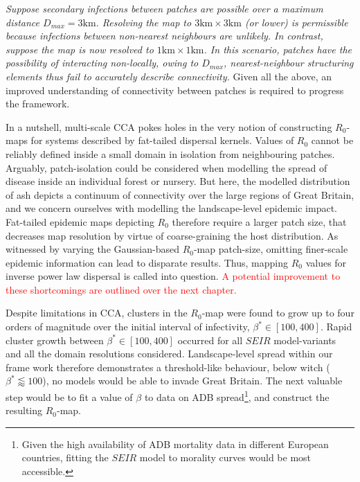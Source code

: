 \textit{Suppose secondary infections between patches are possible over a maximum distance $D_{max} = 3\mathrm{km}$.
Resolving the map to $\mathrm{3km \times 3km}$ (or lower) is permissible because infections between non-nearest neighbours are unlikely.
In contrast, suppose the map is now resolved to $\mathrm{1km \times 1km}$.
In this scenario, patches have the possibility of interacting non-locally, owing to $D_{max}$, nearest-neighbour structuring elements thus fail to accurately describe connectivity.}
Given all the above, an improved understanding of connectivity between patches is required to progress the framework.

In a nutshell, multi-scale CCA pokes holes in the very notion of constructing $R_0$-maps for systems described by fat-tailed dispersal kernels.
Values of $R_0$ cannot be reliably defined inside a small domain in isolation from neighbouring patches.
Arguably, patch-isolation could be considered when modelling the spread of disease inside an individual forest or nursery.
But here, the modelled distribution of ash depicts a continuum of connectivity over the large regions of Great Britain, and we concern ourselves with modelling the landscape-level epidemic impact.
Fat-tailed epidemic maps depicting $R_0$ therefore require a larger patch size, that decreases map resolution by virtue of coarse-graining the host distribution.
As witnessed by varying the Gaussian-based $R_0$-map patch-size, omitting finer-scale epidemic information can lead to disparate results.
Thus, mapping $R_0$ values for inverse power law dispersal is called into question.
\textcolor{red}{A potential improvement to these shortcomings are outlined over the next chapter.}

Despite limitations in CCA, clusters in the $R_0$-map were found to grow up to four orders of magnitude over the initial interval of infectivity, $\beta^*\in [100, 400]$.
Rapid cluster growth between $\beta^*\in [100, 400]$ occurred for all $SEIR$ model-variants and all the domain resolutions considered.
Landscape-level spread within our frame work therefore demonstrates a threshold-like behaviour, below witch ($\beta^* \lessapprox 100$), no models would be able to invade Great Britain.
The next valuable step would be to fit a value of $\beta$ to data on ADB spread\footnote{Given the high availability of ADB mortality data in different European countries, fitting the $SEIR$ model to morality curves would be most accessible.}, 
and construct the resulting $R_0$-map.




